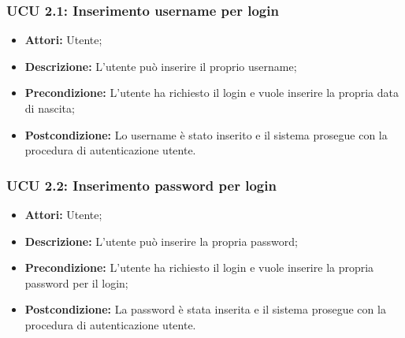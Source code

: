 \hypertarget{U2.1}{}
\subsubsection{UCU 2.1: Inserimento username per login}
\begin{itemize}
\item \textbf{Attori:} Utente;
\item \textbf{Descrizione:} L'utente può inserire il proprio username;
\item \textbf{Precondizione:} L'utente ha richiesto il login e vuole inserire la propria data di nascita;
\item \textbf{Postcondizione:} Lo username è stato inserito e il sistema prosegue con la procedura di autenticazione utente.
\end{itemize}

\hypertarget{U2.2}{}
\subsubsection{UCU 2.2: Inserimento password per login}
\begin{itemize}
\item \textbf{Attori:} Utente;
\item \textbf{Descrizione:} L'utente può inserire la propria password;
\item \textbf{Precondizione:} L'utente ha richiesto il login e vuole inserire la propria password per il login;
\item \textbf{Postcondizione:} La password è stata inserita e il sistema prosegue con la procedura di autenticazione utente.
\end{itemize}

\hypertarget{L0}{}
